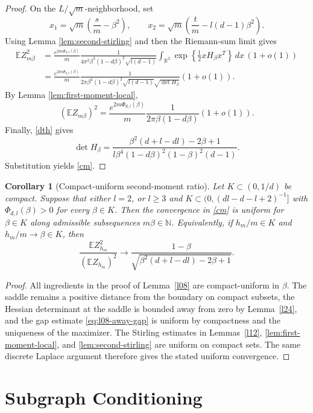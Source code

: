 \documentclass[11pt]{amsart}
\theoremstyle{plain}
\newtheorem{corollary}[theorem]{Corollary}
\numberwithin{equation}{section}
\numberwithin{theorem}{section}
\numberwithin{figure}{section}
\begin{document}
\begin{proof}
On the $L/\sqrt m$-neighborhood, set
\[
x_1=\sqrt m\left(\frac{s}{m}-\beta^2\right),
\qquad
x_2=\sqrt m\left(\frac{t}{m}-l(d-1)\beta^2\right).
\]
Using Lemma \ref{lem:second-stirling} and then the Riemann-sum limit gives
\begin{align*}
\mathbb E Z_{m\beta}^2
&=\frac{e^{2m\Phi_{d,l}(\beta)}}{m}
\frac1{4\pi^2\beta^3(1-d\beta)^2\sqrt{l(d-1)}}
\int_{\mathbb R^2}\exp\left\{\frac12 xH_\beta x^T\right\}\,dx\,(1+o(1))\\
&=\frac{e^{2m\Phi_{d,l}(\beta)}}{m}
\frac{1}{2\pi\beta^3(1-d\beta)^2\sqrt{l(d-1)}\sqrt{\det H_\beta}}
(1+o(1)).
\end{align*}
By Lemma \ref{lem:first-moment-local},
\[
(\mathbb E Z_{m\beta})^2=
\frac{e^{2m\Phi_{d,l}(\beta)}}{m}
\frac1{2\pi\beta(1-d\beta)}(1+o(1)).
\]
Finally, \eqref{dth} gives
\[
\det H_\beta=
\frac{\beta^2(d+l-dl)-2\beta+1}
{l\beta^4(1-d\beta)^2(1-\beta)^2(d-1)}.
\]
Substitution yields \eqref{cm}.
\end{proof}

\begin{corollary}[Compact-uniform second-moment ratio]\label{cor:uniform-second-ratio-L1}
Let $K\subset(0,1/d)$ be compact.  Suppose that either $l=2$, or $l\ge3$ and
$K\subset(0,(dl-d-l+2)^{-1}]$ with $\Phi_{d,l}(\beta)>0$ for every $\beta\in K$.
Then the convergence in \eqref{cm} is uniform for $\beta\in K$ along admissible
subsequences $m\beta\in\mathbb N$.  Equivalently, if $h_m/m\in K$ and
$h_m/m\to\beta\in K$, then
\[
  \frac{\mathbb E Z_{h_m}^2}{(\mathbb E Z_{h_m})^2}
  \longrightarrow
  \frac{1-\beta}{\sqrt{\beta^2(d+l-dl)-2\beta+1}}.
\]
\end{corollary}

\begin{proof}
All ingredients in the proof of Lemma~\ref{l08} are compact-uniform in $\beta$.
The saddle remains a positive distance from the boundary on compact subsets, the
Hessian determinant at the saddle is bounded away from zero by Lemma~\ref{l24},
and the gap estimate \eqref{eq:l08-away-gap} is uniform by compactness and the
uniqueness of the maximizer.  The Stirling estimates in Lemmas~\ref{l12}, \ref{lem:first-moment-local}, and
\ref{lem:second-stirling} are uniform on compact sets.  The same discrete Laplace
argument therefore gives the stated uniform convergence.
\end{proof}

\section{Subgraph Conditioning}\label{sc}
\end{document}
